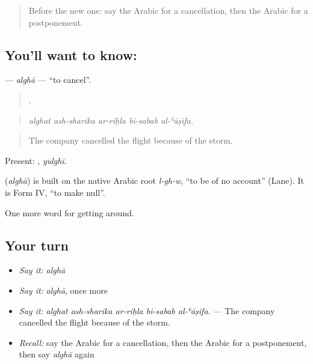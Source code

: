 \label{lesson:AR-C461-algha}



\begin{quote}
Before the new one: say the Arabic for a cancellation, then the Arabic for a postponement.
\end{quote}

\subsection*{You'll want to know: }
\textbf{} — \emph{alghā} — \textquotedblleft{}to cancel\textquotedblright{}.

\begin{quote}
    .
\end{quote}

\begin{quote}
\emph{alghat ash-sharika ar-riḥla bi-sabab al-ʿāṣifa.}
\end{quote}

\begin{quote}
The company cancelled the flight because of the storm.
\end{quote}

Present: , \emph{yulghī}.

\begin{cousinweb}
\textbf{} (\emph{alghā}) is built on the native Arabic root \emph{l-gh-w}, \textquotedblleft{}to be of no account\textquotedblright{} (Lane). It is Form IV, \textquotedblleft{}to make null\textquotedblright{}.
\end{cousinweb}

\begin{grammarlens}[title={What you've built}]
One more word for getting around.
\end{grammarlens}

\subsection*{Your turn}
\begin{itemize}
\raggedright
  \item \emph{Say it:} \emph{alghā}
  \item \emph{Say it:} \emph{alghā}, once more
  \item \emph{Say it:} \emph{alghat ash-sharika ar-riḥla bi-sabab al-ʿāṣifa.} — The company cancelled the flight because of the storm.
  \item \emph{Recall:} say the Arabic for a cancellation, then the Arabic for a postponement, then say \emph{alghā} again
\end{itemize}

